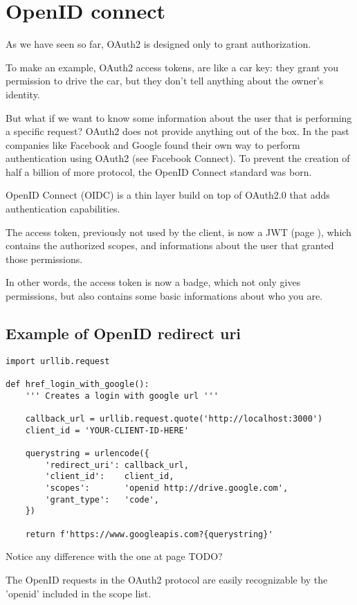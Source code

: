 \section{OpenID connect}
\label{openid}
As we have seen so far, OAuth2 is designed only to grant authorization.

To make an example, OAuth2 access tokens, are like a car key: they grant you
permission to drive the car, but they don't tell anything about the owner's
identity.

But what if we want to know some information about the user that is performing a
specific request?
OAuth2 does not provide anything out of the box. In the past companies like
Facebook  and Google found their own way to perform authentication using OAuth2
(see Facebook Connect).
To prevent the creation of half a billion of more protocol, the OpenID Connect
standard was born.


OpenID Connect (OIDC) is a thin layer build on top of OAuth2.0 that adds
authentication capabilities.

The access token, previously not used by the client, is now a JWT (page
\pageref{jwt}), which contains the authorized scopes, and informations about the
user that granted those permissions.

In other words, the access token is now a badge, which not only gives
permissions, but also contains some basic informations about who you are.

\subsection{Example of OpenID redirect uri}

\begin{lstlisting}
import urllib.request

def href_login_with_google():
    ''' Creates a login with google url '''

    callback_url = urllib.request.quote('http://localhost:3000')
    client_id = 'YOUR-CLIENT-ID-HERE'

    querystring = urlencode({
        'redirect_uri': callback_url,
        'client_id':    client_id,
        'scopes':       'openid http://drive.google.com',
        'grant_type':   'code',
    })

    return f'https://www.googleapis.com?{querystring}'
\end{lstlisting}
Notice any difference with the one at page TODO?

The OpenID requests in the OAuth2 protocol are easily recognizable by the
'openid' included in the scope list.

